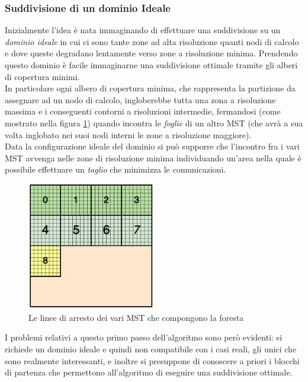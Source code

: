 \subsubsection{Suddivisione di un dominio Ideale}
Inizialmente l'idea è nata immaginando di effettuare una suddivisione su un \emph{dominio ideale} in cui ci sono tante zone ad alta risoluzione quanti nodi di calcolo e dove queste degradano lentamente verso zone a risoluzione minima. Prendendo questo dominio è facile immaginarne una suddivisione ottimale tramite gli alberi di copertura minimi.\\
In particolare ogni albero di copertura minima, che rappresenta la partizione da assegnare ad un nodo di calcolo, ingloberebbe tutta una zona a risoluzione massima e i conseguenti contorni a risoluzioni intermedie, fermandosi (come mostrato nella figura \ref{fig:mst_stop}) quando incontra le \emph{foglie} di un altro MST (che avrà a sua volta inglobato nei suoi nodi interni le zone a risoluzione maggiore).\\
Data la configurazione ideale del dominio si può supporre che l'incontro fra i vari MST avvenga nelle zone di risoluzione minima individuando un'area nella quale è possibile  effettuare un \textit{taglio} che minimizza le comunicazioni.
\begin{figure}[H]
	\centering
	\includegraphics[width=0.5\textwidth]{immagini/block_on_grid.png}
	\caption{Le linee di arresto dei vari MST che compongono la foresta}
		\label{fig:mst_stop}

\end{figure}
I problemi relativi a questo primo passo dell'algoritmo sono però evidenti: si richiede un dominio ideale e quindi non compatibile con i casi reali, gli unici che sono realmente interessanti, e inoltre si presuppone di conoscere a priori i blocchi di partenza che permettono all'algoritmo di eseguire una suddivisione ottimale.\\

